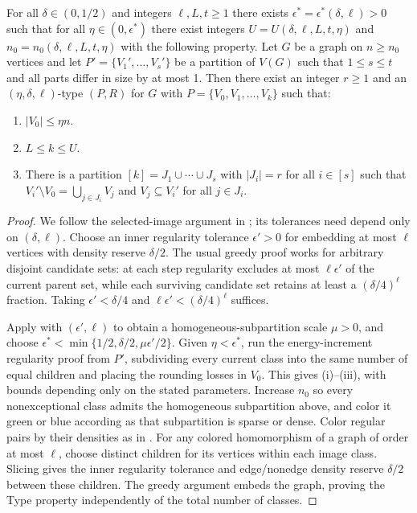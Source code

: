 \begin{lemma}\label{lemma:type-lemma}
For all $\delta\in(0,1/2)$ and integers $\ell,L,t\geq1$ there exists $\epsilon^\ast=\epsilon^\ast(\delta,\ell)>0$ such that for all $\eta\in(0,\epsilon^\ast)$ there exist integers $U=U(\delta,\ell,L,t,\eta)$ and $n_0=n_0(\delta,\ell,L,t,\eta)$ with the following property. Let $G$ be a graph on $n\geq n_0$ vertices and let $P'=\{V_1',\dots,V_s'\}$ be a partition of $V(G)$ such that $1\leq s\leq t$ and all parts differ in size by at most 1.
Then there exist an integer $r\geq1$ and an $(\eta,\delta,\ell)$-type $(P,R)$ for $G$ with
$P=\{V_0,V_1,\dots,V_k\}$ such that:
\begin{enumerate}[
  label=\textit{(\roman*)},
  ref=(\textit{\roman*}),
  topsep=5pt
]
    \item $|V_0|\leq \eta n$.
    \item $L\leq k\leq U$.
    \item There is a partition $[k]=J_1\cup\cdots\cup J_s$ with $|J_i|=r$ for all $i\in[s]$ such that $V_i'\setminus V_0=\bigcup_{j\in J_i} V_j$ and $V_j\subseteq V_i'$ for all $j\in J_i$.
\end{enumerate}
\end{lemma}
\begin{proof}
We follow the selected-image argument in \cite[Lemma~2.9]{bottcher2012perfect}; its tolerances need depend only on $(\delta,\ell)$. Choose an inner regularity tolerance $\epsilon'>0$ for embedding at most $\ell$ vertices with density reserve $\delta/2$. The usual greedy proof works for arbitrary disjoint candidate sets: at each step regularity excludes at most $\ell\epsilon'$ of the current parent set, while each surviving candidate set retains at least a $(\delta/4)^\ell$ fraction. Taking $\epsilon'<\delta/4$ and $\ell\epsilon'<(\delta/4)^\ell$ suffices.

Apply \cite[Lemma~2.5]{bottcher2012perfect} with $(\epsilon',\ell)$ to obtain a homogeneous-subpartition scale $\mu>0$, and choose $\epsilon^\ast<\min\{1/2,\delta/2,\mu\epsilon'/2\}$. Given $\eta<\epsilon^\ast$, run the energy-increment regularity proof from $P'$, subdividing every current class into the same number of equal children and placing the rounding losses in $V_0$. This gives (i)--(iii), with bounds depending only on the stated parameters. Increase $n_0$ so every nonexceptional class admits the homogeneous subpartition above, and color it green or blue according as that subpartition is sparse or dense. Color regular pairs by their densities as in . For any colored homomorphism of a graph of order at most $\ell$, choose distinct children for its vertices within each image class. Slicing gives the inner regularity tolerance and edge/nonedge density reserve $\delta/2$ between these children. The greedy argument embeds the graph, proving the Type property independently of the total number of classes.
\end{proof}

